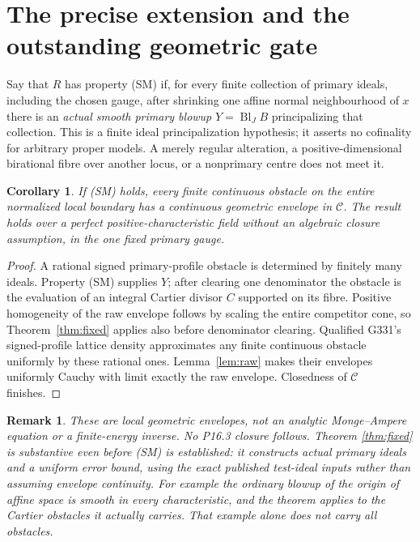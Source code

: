 \documentclass[11pt]{article}
\newtheorem{corollary}[theorem]{Corollary}
\newtheorem{remark}[theorem]{Remark}
\newcommand{\cC}{\mathcal C}
\begin{document}
\section{The precise extension and the outstanding geometric gate}
Say that $R$ has property (SM) if, for every finite collection of primary
ideals, including the chosen gauge, after shrinking one affine normal
neighbourhood of $x$ there is an \emph{actual smooth primary blowup}
$Y=\operatorname{Bl}_J B$ principalizing that collection. This is a finite
ideal principalization hypothesis; it asserts no cofinality for arbitrary
proper models. A merely regular alteration, a positive-dimensional
birational fibre over another locus, or a nonprimary centre does not meet it.

\begin{corollary}\label{cor:SM}
If (SM) holds, every finite continuous obstacle on the entire normalized
local boundary has a continuous geometric envelope in $\cC$. The result
holds over a perfect positive-characteristic field without an algebraic
closure assumption, in the one fixed primary gauge.
\end{corollary}
\begin{proof}
A rational signed primary-profile obstacle is determined by finitely many
ideals. Property (SM) supplies $Y$; after clearing one denominator the
obstacle is the evaluation of an integral Cartier divisor $C$ supported
on its fibre. Positive homogeneity of the raw envelope follows by scaling
the entire competitor cone, so Theorem~\ref{thm:fixed} applies also before
denominator clearing. Qualified G331's signed-profile lattice density
approximates any finite continuous obstacle uniformly by these rational
ones. Lemma~\ref{lem:raw} makes their envelopes uniformly Cauchy with
limit exactly the raw envelope. Closedness of $\cC$ finishes.
\end{proof}

\begin{remark}
These are local geometric envelopes, not an analytic Monge--Ampere
equation or a finite-energy inverse. No P16.3 closure follows. Theorem
\ref{thm:fixed} is substantive even before (SM) is established: it
constructs actual primary ideals and a uniform error bound, using the
exact published test-ideal inputs rather than assuming envelope continuity.
For example the ordinary blowup of the origin of affine space is smooth
in every characteristic, and the theorem applies to the Cartier obstacles
it actually carries. That example alone does not carry all obstacles.
\end{remark}
\end{document}

